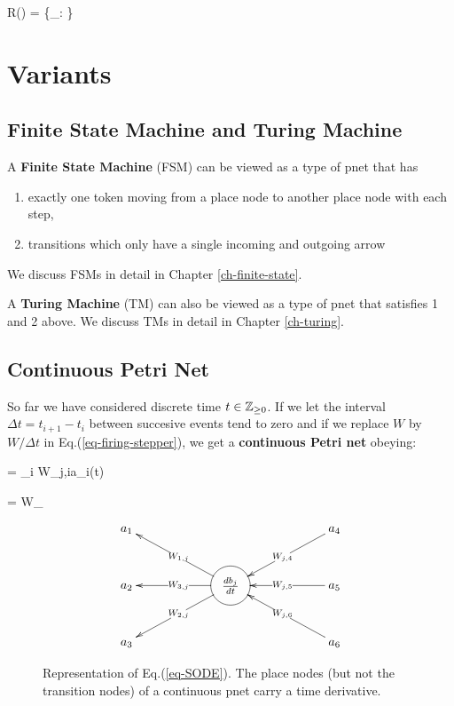\beq
R(\Phi) = \{_\calp: 
 \}
\eeq

\section{Variants}

\subsection{Finite State Machine and Turing Machine}
A {\bf Finite State Machine}
(FSM)
can be viewed as 
a type of pnet that has
\begin{enumerate}
\item exactly one token moving from a place node to another place node with each step,
\item transitions which only have a single incoming and outgoing arrow
\end{enumerate}
We discuss 
FSMs in detail in Chapter \ref{ch-finite-state}.

A {\bf Turing Machine} (TM) can also be viewed as 
a type of pnet that satisfies 1 and 2 above.
We discuss TMs in detail in Chapter \ref{ch-turing}.




\subsection{Continuous Petri Net}
So far we have considered
discrete time $t\in {\mathbb{Z}}_{\geq 0}$.
If we let the interval $\Delta t=t_{i+1}-t_i$ between
succesive events tend to zero
and if we replace $W$ by 
$W/\Delta t$ in Eq.(\ref{eq-firing-stepper}), we get
a {\bf continuous Petri net} obeying:

\beq
{}=
\sum_i W_{j,i}a_i(t)
\label{eq-SODE}
\eeq


\beq
{}=
W_\calx
\label{eq-diff-eq-W}
\eeq


\begin{figure}[h!]
$$
\xymatrix@C=5pc{
{a_1}
&&{a_4}
\ar[dl]|{W_{j,4}}
\\
{a_2}
&
*+++[o][F-]{\frac{db_j}{dt}}
\ar[lu]|{W_{1, j}}
\ar[ld]|{W_{2,j}}
\ar[l]|{W_{3, j}}
& {a_5}
\ar[l]|{W_{j,5}}
\\
{a_3}
&&
{a_6}
\ar[lu]|{W_{j,6}}
}$$
\caption{Representation of Eq.(\ref{eq-SODE}). The place nodes (but not the transition nodes)
of a continuous pnet carry a time derivative.}
\label{fig-continuous-pn}
\end{figure}



